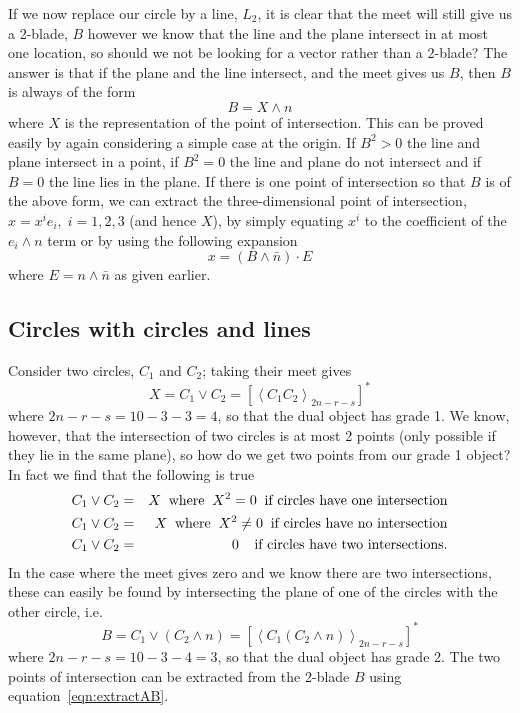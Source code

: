 If we now replace our circle by a line, $L_2$, it is
clear that the meet will still give us a 2-blade, $B$
however we know that the line and the plane intersect in at
most one location, so should we not be looking for a
vector rather than a 2-blade? The answer is that if the
plane and the line intersect, and the meet gives us $B$,
then $B$ is always of the form
%
\[  B = X\wedge n  \]
%
where $X$ is the representation of the point of intersection. This can be
proved easily by again considering a simple case at the
origin. If $B^2>0$ the line and plane intersect in a
point, if $B^2=0$ the line and plane do not intersect and
if $B=0$ the line lies in the plane. If there is one
point of intersection so that $B$ is of the above form,
we can extract the three-dimensional point of intersection,
$x=x^ie_i,\;i=1,2,3$ (and hence $X$), by simply equating
$x^i$ to the coefficient of the $e_i\wedge n$ term or by
using the following expansion
%
\begin{equation}
 x = (B\wedge \bar{n})\cdot E
 \end{equation}
%
where $E=n\wedge \bar{n}$ as given earlier.


\subsection{Circles with circles and lines }

Consider two circles, $C_1$ and $C_2$; taking their meet
gives
%
\begin{equation}
X = C_1 \vee C_2 = \left[\left< C_1 C_2
\right>_{2n-r-s}\right]^*
\end{equation}
%
where $2n-r-s=10-3-3=4$, so that the dual object has
grade 1. We know, however, that the intersection of two
circles is at most 2 points (only possible if
they lie in the same plane), so how do we get two
points from our grade 1 object? In fact we find
that the following is true
%
\begin{eqnarray}
C_1 \vee C_2  &  =  &  X \;\;\mbox{where}\;\;
X^2=0\;\;\mbox{if circles have one intersection} \nonumber \\
C_1 \vee C_2  &  =  &  X \;\;\mbox{where}\;\;
X^2\ne 0\;\;\mbox{if circles have no intersection} \nonumber \\
C_1 \vee C_2  &  =  &  0 \;\; \;\;\mbox{if circles have
two intersections}.
\end{eqnarray}
%
In the case where the meet gives zero and we know there
are two intersections, these can easily be found by
intersecting the plane of one of the circles with the
other circle, i.e.
%
\begin{equation}
B = C_1 \vee (C_2\wedge n) =  \left[\left< C_1 (C_2\wedge n)
\right>_{2n-r-s}\right]^*
\end{equation}
%
where $2n-r-s=10-3-4=3$, so that the dual object has
grade 2. The two points of intersection can be
extracted from the 2-blade $B$ using
equation~\ref{eqn:extractAB}.

